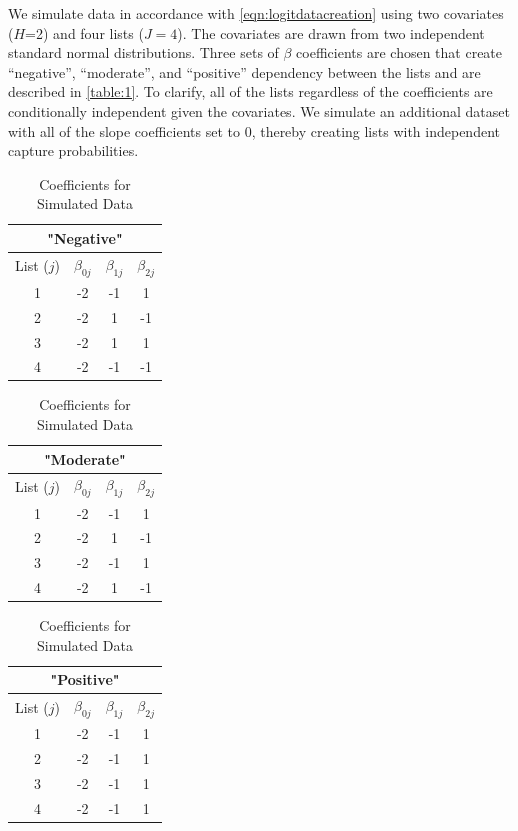 \documentclass[
  12pt,
]{article}
\begin{document}
We simulate data in accordance with \autoref{eqn:logitdatacreation}
using two covariates (\(H\)=2) and four lists (\(J=4\)). The covariates
are drawn from two independent standard normal distributions. Three sets
of \(\beta\) coefficients are chosen that create ``negative'',
``moderate'', and ``positive'' dependency between the lists and are
described in \autoref{table:1}. To clarify, all of the lists regardless
of the coefficients are conditionally independent given the covariates.
We simulate an additional dataset with all of the slope coefficients set
to 0, thereby creating lists with independent capture probabilities.

\singlespacing
\begin{table}[H]
\centering
\begin{tabular}{||c c c c||} 
 \hline
 \multicolumn{4}{||c||}{"Negative"}\\
 \hline
 List ($j$) & $\beta_{0j}$ & $\beta_{1j}$ & $\beta_{2j}$   \\ [0.5ex] 
 \hline\hline
 1 & -2 &  -1  & 1 \\ 
 2 & -2 & 1  &  -1 \\
 3 & -2 & 1  &  1 \\
 4 & -2 &  -1  &  -1 \\
 \hline
\end{tabular}
\begin{tabular}{||c c c c||} 
\hline
 \multicolumn{4}{||c||}{"Moderate"}\\
 \hline
 List ($j$) & $\beta_{0j}$ & $\beta_{1j}$ & $\beta_{2j}$   \\ [0.5ex] 
 \hline\hline
 1 & -2 &  -1  & 1 \\ 
 2 & -2 & 1  &  -1 \\
 3 & -2 & -1  &  1 \\
 4 & -2 &  1  &  -1 \\
 \hline
\end{tabular}
\begin{tabular}{||c c c c||} 
 \hline
 \multicolumn{4}{||c||}{"Positive"}\\
 \hline
 List ($j$) & $\beta_{0j}$ & $\beta_{1j}$ & $\beta_{2j}$   \\ [0.5ex] 
 \hline\hline
 1 & -2 &  -1  & 1 \\ 
 2 & -2 & -1  &  1 \\
 3 & -2 & -1  &  1 \\
 4 & -2 &  -1  &  1 \\
 \hline
\end{tabular}
\caption{Coefficients for Simulated Data}
\label{table:1}
\end{table}
\doublespacing
\end{document}
